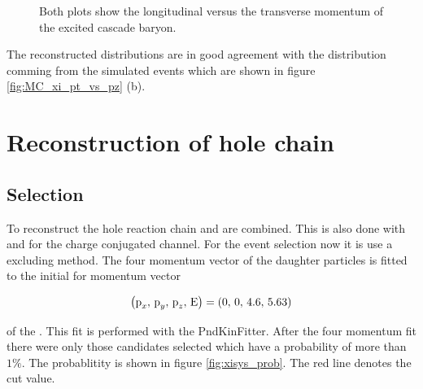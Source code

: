 	\begin{figure}
		\centering
		\caption{Both plots show the longitudinal versus the transverse momentum of the excited cascade baryon.}
		\label{fig:xi1820_pt_vs_pz}
	\end{figure}
	
	The reconstructed distributions are in good agreement with the distribution comming from the simulated events which are 
	shown in figure \ref{fig:MC_xi_pt_vs_pz} (b).
	
\section{Reconstruction of hole chain}

	\subsection*{Selection}
	
	To reconstruct the hole reaction chain \excitedcascade and \anticascade are combined.
	This is also done with \excitedanticascade and \cascade for the charge conjugated channel.
	For the event selection now it is use a excluding method. 
	The four momentum vector of the daughter particles is fitted to the initial for momentum vector  

	\begin{center}
		\begin{equation}\nonumber
			\left(\textnormal{p}_x,\, \textnormal{p}_y,\, \textnormal{p}_z,\, \textnormal{E} \right) = \left(0,\, 0,\, 4.6,\, 5.63 \right)
		\end{equation}
	\end{center}
	of the \pbarpSystem.	
	This fit is performed with the PndKinFitter.
	After the four momentum fit there were only those candidates selected which have a \chisq probability of more than $1\%$.
	The \chisq probablitity is shown in figure \ref{fig:xisys_prob}. 
	The red line denotes the cut value.

